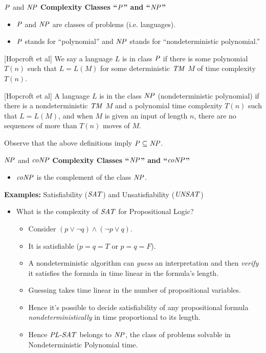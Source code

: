 \documentclass[style=sailor,size=12pt]{powerdot}
\begin{document}
\begin{wideslide}[bm=,toc=]{$\mbox{\it P\/}$ and $\mbox{\it NP\/}$}
{\bf Complexity Classes ``$\mbox{\it P\/}$'' and ``$\mbox{\it NP\/}$''}
\begin{itemize}
\item $\mbox{\it P\/}$ and $\mbox{\it NP\/}$ are classes of problems (i.e. languages).
\item $\mbox{\it P\/}$ stands for ``polynomial'' and $\mbox{\it NP\/}$ stands for ``nondeterministic
polynomial.''
\end{itemize}
\pause
\begin{defn}{}[Hopcroft et al]
We say a language $L$ is in class $\mbox{\it P\/}$ if there is some polynomial $T(n)$ such
that $L = L(M)$ for some deterministic $\mathit{TM}$ $M$ of time complexity
$T(n)$. 
\end{defn}

\pause
\begin{defn}{}[Hopcroft et al]
A language $L$ is in the class $\mbox{\it NP\/}$ (nondeterministic polynomial) if there
is a nondeterministic $\mathit{TM}$ $M$ and a polynomial time complexity $T(n)$
such that $L = L(M)$, and when $M$ is given an input of length $n$, there are
no sequences of more than $T(n)$ moves of $M$.
\end{defn}
Observe that the above definitions imply $\mbox{\it P\/} \subseteq \mbox{\it NP\/}$.
\end{wideslide}

\begin{wideslide}[bm=,toc=]{$\mbox{\it NP\/}$ and $\mbox{\it coNP\/}$}
{\bf Complexity Classes ``$\mbox{\it NP\/}$'' and ``$\mbox{\it coNP\/}$''}
\begin{itemize}
\item $\mbox{\it coNP\/}$ is the complement of the class $\mbox{\it NP\/}$.
\end{itemize}

{\bf Examples:} Satisfiability ($\mbox{\it SAT\/}$) and Unsatisfiability ($\mbox{\it UNSAT\/}$) 
\begin{itemize}
\item<2-> What is the complexity of $\mbox{\it SAT\/}$ for Propositional Logic?
\begin{itemize}
\item<3-> Consider $(p\vee\neg q)\wedge(\neg p\vee q)$.
\item<3-> It is satisfiable ($p=q=T$ or $p=q=F$).
\item<3-> A nondeterministic algorithm can {\em guess\/} an interpretation and then {\em verify\/}
it satisfies the formula in time linear in the formula's length.
\item<3-> Guessing takes time linear in the number of propositional variables.
\item<3-> Hence it's possible to decide satisfiability of any propositional formula {\em nondeterministically\/}
in time proportional to its length.
\item<4-> Hence $\mbox{\it PL-SAT\/}$ belongs to $\mbox{\it NP\/}$, the class of problems 
solvable in Nondeterministic Polynomial time.
\end{itemize}
\end{itemize}
\end{wideslide}
\end{document}
